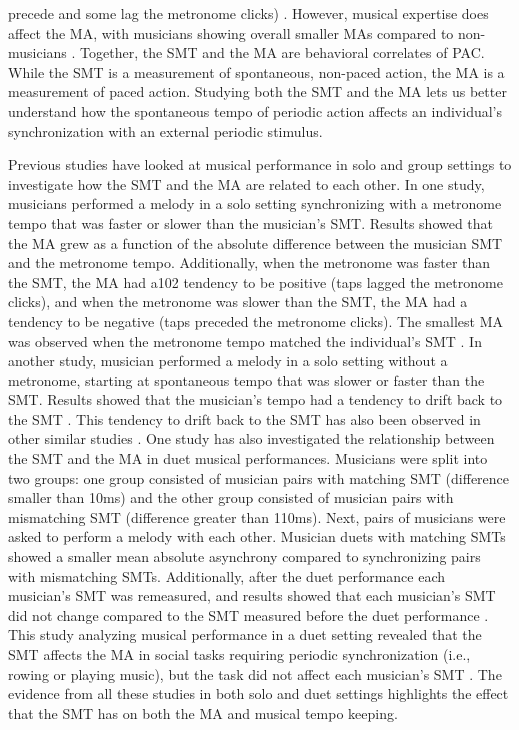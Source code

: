\documentclass{report}
\begin{document}
precede and some lag the metronome clicks) \cite{baaaath2016estimating}. However, musical expertise does affect the MA, with musicians showing overall smaller MAs compared to non-musicians \cite{repp2007tapping}. Together, the SMT and the MA are behavioral correlates of PAC. While the SMT is a measurement of spontaneous, non-paced action, the MA is a measurement of paced action. Studying both the SMT and the MA lets us better understand how the spontaneous tempo of periodic action affects an individual's synchronization with an external periodic stimulus.

Previous studies have looked at musical performance in solo and group settings to investigate how the SMT and the MA are related to each other. In one study, musicians performed a melody in a solo setting synchronizing with a metronome tempo that was faster or slower than the musician's SMT. Results showed that the MA grew as a function of the absolute difference between the musician SMT and the metronome tempo. Additionally, when the metronome was faster than the SMT, the MA had a102 tendency to be positive (taps lagged the metronome clicks), and when the metronome was slower than the SMT, the MA had a tendency to be negative (taps preceded the metronome clicks). The smallest MA was observed when the metronome tempo matched the individual's SMT \cite{scheurich2018tapping}. In another study, musician performed a melody in a solo setting without a metronome, starting at spontaneous tempo that was slower or faster than the SMT. Results showed that the musician's tempo had a tendency to drift back to the SMT \cite{zamm2018musicians}. This tendency to drift back to the SMT has also been observed in other similar studies \cite{mcauley2006time, yu2003task}. One study has also investigated the relationship between the SMT and the MA in duet musical performances. Musicians were split into two groups: one group consisted of musician pairs with matching SMT (difference smaller than 10ms) and the other group consisted of musician pairs with mismatching SMT (difference greater than 110ms). Next, pairs of musicians were asked to perform a melody with each other. Musician duets with matching SMTs showed a smaller mean absolute asynchrony compared to synchronizing pairs with mismatching SMTs. Additionally, after the duet performance each musician's SMT was remeasured, and results showed that each musician's SMT did not change compared to the SMT measured before the duet performance \cite{zamm2016endogenous}. This study analyzing musical performance in a duet setting revealed that the SMT affects the MA in social tasks requiring periodic synchronization (i.e., rowing or playing music), but the task did not affect each musician's SMT \cite{zamm2016endogenous}. The evidence from all these studies in both solo and duet settings highlights the effect that the SMT has on both the MA and musical tempo keeping.
\end{document}
